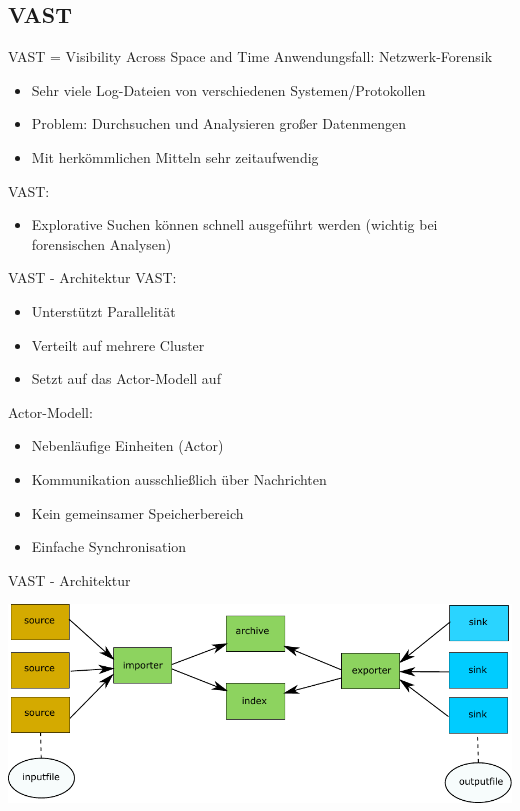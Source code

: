 \documentclass[9pt]{beamer}
\begin{document}
\subsection{VAST}

\begin{frame}{VAST = Visibility Across Space and Time}{}
	Anwendungsfall: Netzwerk-Forensik
	\begin{itemize}
		\item Sehr viele Log-Dateien von verschiedenen Systemen/Protokollen
		\item Problem: Durchsuchen und Analysieren großer Datenmengen
		\item Mit herkömmlichen Mitteln sehr zeitaufwendig
	\end{itemize}
	VAST:
	\begin{itemize}
		\item Explorative Suchen können schnell ausgeführt werden (wichtig bei forensischen Analysen)
	\end{itemize}
\end{frame}

\begin{frame}{VAST - Architektur}{}
	VAST:
	\begin{itemize}
		\item Unterstützt Parallelität
		\item Verteilt auf mehrere Cluster
		\item Setzt auf das Actor-Modell auf
	\end{itemize}	
	Actor-Modell:
	\begin{itemize}
		\item Nebenläufige Einheiten (Actor)
		\item Kommunikation ausschließlich über Nachrichten
		\item Kein gemeinsamer Speicherbereich
		\item Einfache Synchronisation
	\end{itemize}
\end{frame}
\begin{frame}{VAST - Architektur}{}
	\begin{center}
		\includegraphics[width=1.0\textwidth]{res/vast.pdf}
	\end{center}
\end{frame}
\end{document}
